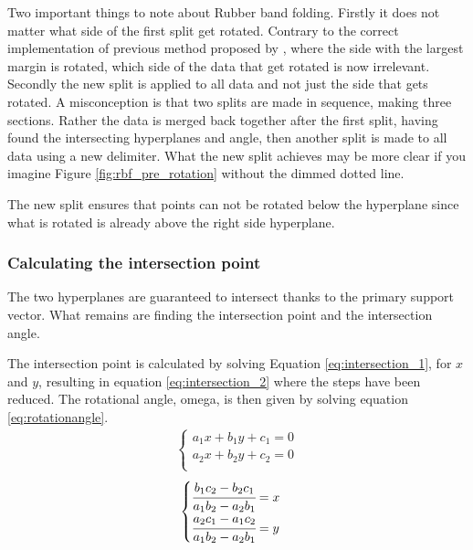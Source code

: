 \documentclass[a4paper,twoside]{bth}
\begin{document}
\par Two important things to note about Rubber band folding. Firstly it does not matter what side of the first split get rotated. Contrary to the correct implementation of previous method proposed by \cite{unpublished}, where the side with the largest margin is rotated, which side of the data that get rotated is now irrelevant. Secondly the new split is applied to all data and not just the side that gets rotated. A misconception is that two splits are made in sequence, making three sections. Rather the data is merged back together after the first split, having found the intersecting hyperplanes and angle, then another split is made to all data using a new delimiter. What the new split achieves may be more clear if you imagine Figure \ref{fig:rbf_pre_rotation} without the dimmed dotted line.

\par The new split ensures that points can not be rotated below the hyperplane since what is rotated is already above the right side hyperplane.




\subsubsection{Calculating the intersection point}
\par The two hyperplanes are guaranteed to intersect thanks to the primary support vector. What remains are finding the intersection point and the intersection angle.

\par The intersection point is calculated by solving Equation \ref{eq:intersection_1}, for $x$ and $y$, resulting in equation \ref{eq:intersection_2} where the steps have been reduced. The rotational angle, omega, is then given by solving equation \ref{eq:rotationangle}.
\begin{equation}\label{eq:intersection_1}
\begin{aligned}
   \begin{cases}
    a_1 x + b_1  y + c_1 = 0 \\
    a_2 x + b_2 y + c_2 = 0 \\
    \end{cases}
\end{aligned}
\end{equation} 
\begin{equation}\label{eq:intersection_2}
\begin{aligned}
   \begin{cases}
    \cfrac{b_1 c_2 - b_2 c_1}{a_1 b_2 - a_2 b_1}  = x \\
    \cfrac{a_2 c_1 - a_1 c_2}{a_1 b_ 2 - a_2 b_1} = y\\
    \end{cases}
\end{aligned}
\end{equation} 
\end{document}

